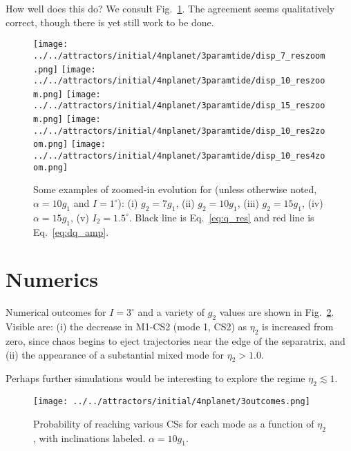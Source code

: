 \documentclass[11pt,
        usenames, %
        dvipsnames %
    ]{article}
\begin{document}
How well does this do? We consult Fig.~\ref{fig:zooms}. The agreement seems
qualitatively correct, though there is yet still work to be done.
\begin{figure}
    \centering
    \texttt{[image: ../../attractors/initial/4nplanet/3paramtide/disp\_7\_reszoom.png]}
    \texttt{[image: ../../attractors/initial/4nplanet/3paramtide/disp\_10\_reszoom.png]}
    \texttt{[image: ../../attractors/initial/4nplanet/3paramtide/disp\_15\_reszoom.png]}
    \texttt{[image: ../../attractors/initial/4nplanet/3paramtide/disp\_10\_res2zoom.png]}
    \texttt{[image: ../../attractors/initial/4nplanet/3paramtide/disp\_10\_res4zoom.png]}
    \caption{Some examples of zoomed-in evolution for (unless otherwise noted,
    $\alpha = 10g_1$ and $I = 1^\circ$): (i) $g_2 = 7g_1$, (ii)
    $g_2 = 10g_1$, (iii) $g_2 = 15g_1$, (iv) $\alpha = 15g_1$, (v) $I_2 =
    1.5^\circ$. Black line is Eq.~\eqref{eq:q_res} and red line is
    Eq.~\eqref{eq:dq_amp}.}\label{fig:zooms}
\end{figure}

\section{Numerics}

Numerical outcomes for $I = 3^\circ$ and a variety of $g_2$ values are shown in
Fig.~\ref{fig:outcomes}. Visible are: (i) the decrease in M1-CS2 (mode 1, CS2)
as $\eta_2$ is increased from zero, since chaos begins to eject trajectories
near the edge of the separatrix, and (ii) the appearance of a substantial mixed
mode for $\eta_2 > 1.0$.

Perhaps further simulations would be interesting to explore the regime $\eta_2
\lesssim 1$.
\begin{figure}
    \centering
    \texttt{[image: ../../attractors/initial/4nplanet/3outcomes.png]}
    \caption{Probability of reaching various CSs for each mode as a function of
    $\eta_2$, with inclinations labeled. $\alpha = 10g_1$.}\label{fig:outcomes}
\end{figure}
\end{document}
